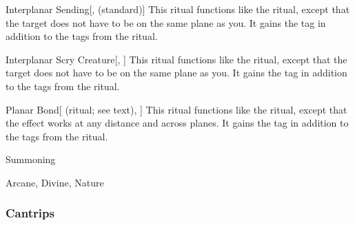 \lowercase{\hypertarget{spell:Interplanar Sending}{}}\label{spell:Interplanar Sending}
\begin{apability}[Rank 7]{\hypertarget{spell:Interplanar Sending}{Interplanar Sending}}[,  (standard)]
This ritual functions like the  ritual, except that the target does not have to be on the same plane as you.
It gains the  tag in addition to the tags from the  ritual.
\end{apability}
\vspace{0.25em}



\lowercase{\hypertarget{spell:Interplanar Scry Creature}{}}\label{spell:Interplanar Scry Creature}
\begin{apability}[Rank 8]{\hypertarget{spell:Interplanar Scry Creature}{Interplanar Scry Creature}}[, ]
This ritual functions like the  ritual, except that the target does not have to be on the same plane as you.
It gains the  tag in addition to the tags from the  ritual.
\end{apability}
\vspace{0.25em}



\lowercase{\hypertarget{spell:Planar Bond}{}}\label{spell:Planar Bond}
\begin{attuneability}[Rank 8]{\hypertarget{spell:Planar Bond}{Planar Bond}}[ (ritual; see text), ]
This ritual functions like the  ritual, except that the effect works at any distance and across planes.
It gains the  tag in addition to the tags from the  ritual.
\end{attuneability}
\vspace{0.25em}


\newpage
\begin{spellsection}{Summoning}

\begin{spellheader}
\end{spellheader}


 Arcane, Divine, Nature

\subsubsection{Cantrips}


\end{spellsection}


